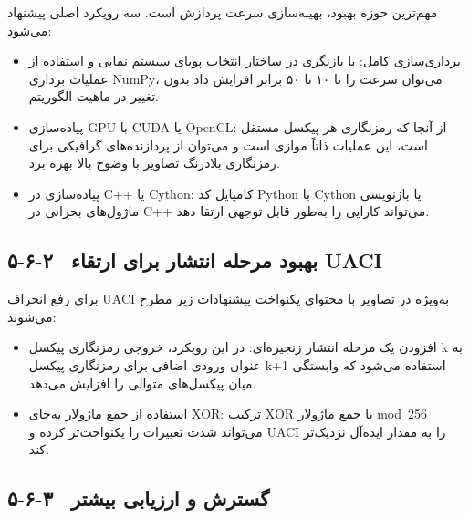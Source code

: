 مهم‌ترین حوزه بهبود، بهینه‌سازی سرعت پردازش است. سه رویکرد اصلی پیشنهاد می‌شود:

\begin{itemize}
    \item برداری‌سازی کامل: با بازنگری در ساختار انتخاب پویای سیستم نمایی و استفاده از عملیات برداری ‎NumPy‎، می‌توان سرعت را تا ۱۰ تا ۵۰ برابر افزایش داد بدون تغییر در ماهیت الگوریتم.
\end{itemize}

\begin{itemize}
    \item پیاده‌سازی ‎GPU‎ با ‎CUDA‎ یا ‎OpenCL‎: از آنجا که رمزنگاری هر پیکسل مستقل است، این عملیات ذاتاً موازی است و می‌توان از پردازنده‌های گرافیکی برای رمزنگاری بلادرنگ تصاویر با وضوح بالا بهره برد.
\end{itemize}

\begin{itemize}
    \item پیاده‌سازی در ‎C++‎ یا ‎Cython‎:  کامپایل کد ‎Python‎ با ‎Cython‎ یا بازنویسی ماژول‌های بحرانی در ‎C++‎  می‌تواند کارایی را به‌طور قابل توجهی ارتقا دهد.
\end{itemize}

\subsection{۵-۶-۲  بهبود مرحله انتشار برای ارتقاء ‎UACI‎}

برای رفع انحراف ‎UACI‎  به‌ویژه در تصاویر با محتوای یکنواخت پیشنهادات زیر مطرح می‌شوند:

\begin{itemize}
    \item افزودن یک مرحله انتشار زنجیره‌ای: در این رویکرد، خروجی رمزنگاری پیکسل ‎k‎ به عنوان ورودی اضافی برای رمزنگاری پیکسل ‎k+1‎ استفاده می‌شود که وابستگی میان پیکسل‌های متوالی را افزایش می‌دهد.
\end{itemize}

\begin{itemize}
    \item استفاده از جمع ماژولار به‌جای ‎XOR‎: ترکیب ‎XOR‎ با جمع ماژولار ‎mod~256‎ می‌تواند شدت تغییرات را یکنواخت‌تر کرده و ‎UACI‎ را به مقدار ایده‌آل نزدیک‌تر کند.
\end{itemize}

\subsection{۵-۶-۳  گسترش و ارزیابی بیشتر}

